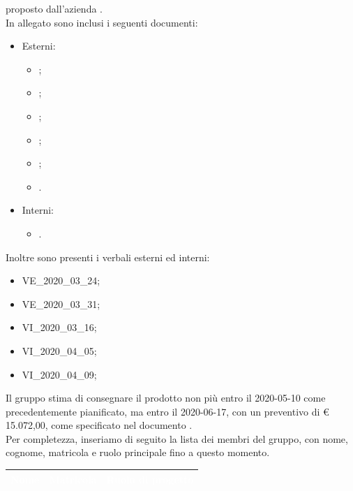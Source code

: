 \documentclass[12pt]{letter}
\begin{document}
\begin{letter}
        proposto dall'azienda \textbf{\Proponente{}}.\\
        In allegato sono inclusi i seguenti documenti:
        \begin{itemize}
            \item Esterni:
            \begin{itemize}
                \item {};
                \item {};
                \item {};
                \item {};
                \item {};
                \item {}.
            \end{itemize}
            \item Interni:
            \begin{itemize}
                \item {}.
            \end{itemize}
        \end{itemize}
        Inoltre sono presenti i verbali esterni ed interni:
        \begin{itemize}
            \item VE\_2020\_03\_24;
            \item VE\_2020\_03\_31;
            \item VI\_2020\_03\_16;
            \item VI\_2020\_04\_05;
            \item VI\_2020\_04\_09;
        \end{itemize}
        Il gruppo stima di consegnare il prodotto non più entro il 2020-05-10 come precedentemente pianificato, ma entro il 2020-06-17, con un preventivo di \euro{} 15.072,00, come specificato nel documento \PdP{}.\\
        Per completezza, inseriamo di seguito la lista dei membri del gruppo, con nome, cognome, matricola e ruolo principale fino a questo momento.
        {
            \renewcommand{\arraystretch}{1.5}
            \begin{longtable}{ C{4cm} C{3cm} C{6cm} }
                \textcolor{white}{\textbf{Nome}} & \textcolor{white}{\textbf{Matricola}} & \textcolor{white}{\textbf{Ruolo di progetto}}\\
                \endhead 

\end{longtable}}
\end{letter}
\end{document}

